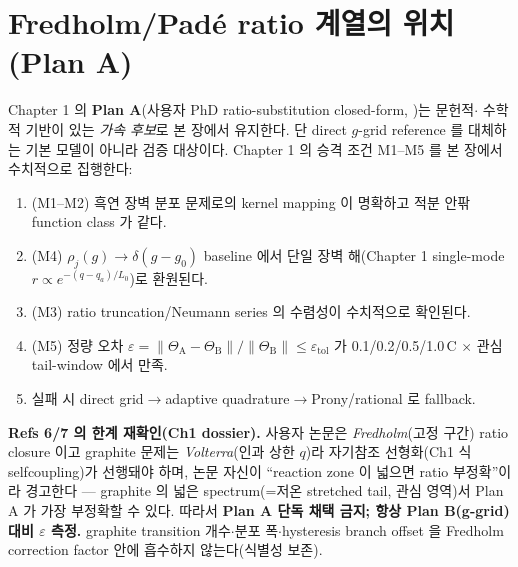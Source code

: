 \section{Fredholm/Padé ratio 계열의 위치 (Plan A)}\label{sec:ch6_fredholm}
Chapter 1 의 \textbf{Plan A}(사용자 PhD ratio-substitution closed-form, \cite{lee2011,son2013})는 문헌적$\cdot$
수학적 기반이 있는 \emph{가속 후보}로 본 장에서 유지한다. 단 direct $g$-grid reference 를 대체하는 기본 모델이
아니라 검증 대상이다. Chapter 1 의 승격 조건 M1--M5 를 본 장에서 수치적으로 집행한다:
\begin{enumerate}[label=F\arabic*),leftmargin=2.2em]
\item (M1--M2) 흑연 장벽 분포 문제로의 kernel mapping 이 명확하고 적분 안팎 function class 가 같다.
\item (M4) $\rho_j(g)\to\delta(g-g_0)$ baseline 에서 단일 장벽 해(Chapter 1 single-mode
  $r\propto e^{-(q-q_a)/L_0}$)로 환원된다.
\item (M3) ratio truncation/Neumann series 의 수렴성이 수치적으로 확인된다.
\item (M5) 정량 오차
  $\varepsilon=\lVert\Theta_{\mathrm A}-\Theta_{\mathrm B}\rVert/\lVert\Theta_{\mathrm B}\rVert\le\varepsilon_{\mathrm{tol}}$
  가 0.1/0.2/0.5/1.0\,C $\times$ 관심 tail-window 에서 만족.
\item 실패 시 direct grid$\to$adaptive quadrature$\to$Prony/rational 로 fallback.
\end{enumerate}
\begin{boundbox}
\textbf{Refs 6/7 의 한계 재확인(Ch1 dossier).} 사용자 논문은 \emph{Fredholm}(고정 구간) ratio closure 이고
graphite 문제는 \emph{Volterra}(인과 상한 $q$)라 자기참조 선형화(Ch1 식 selfcoupling)가 선행돼야 하며, 논문
자신이 ``reaction zone 이 넓으면 ratio 부정확''이라 경고한다 — graphite 의 넓은 spectrum(=저온 stretched
tail, 관심 영역)서 Plan A 가 가장 부정확할 수 있다. 따라서 \textbf{Plan A 단독 채택 금지; 항상 Plan B(g-grid)
대비 $\varepsilon$ 측정.} graphite transition 개수$\cdot$분포 폭$\cdot$hysteresis branch offset 을 Fredholm
correction factor 안에 흡수하지 않는다(식별성 보존).
\end{boundbox}

